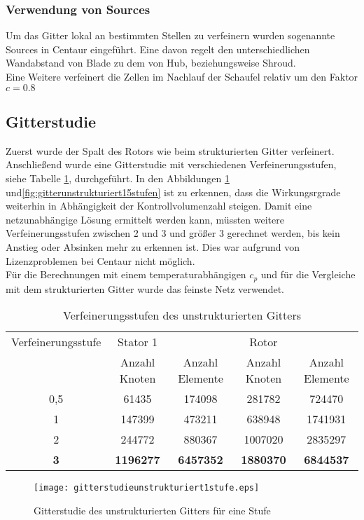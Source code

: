 \subsubsection{Verwendung von Sources}
Um das Gitter lokal an bestimmten Stellen zu verfeinern wurden sogenannte Sources in Centaur eingeführt.
Eine davon regelt den unterschiedlichen Wandabstand von Blade zu dem von Hub, beziehungsweise Shroud.\\
Eine Weitere verfeinert die Zellen im Nachlauf der Schaufel relativ um den Faktor $c = 0.8$

\subsection{Gitterstudie}
Zuerst wurde der Spalt des Rotors wie beim strukturierten Gitter verfeinert. Anschließend wurde eine Gitterstudie mit verschiedenen Verfeinerungsstufen, siehe Tabelle \ref{tab:verfeinerungenunstrukturiert}, durchgeführt. In den Abbildungen \ref{fig:gitterunstrukturiert1stufe} und\ref{fig:gitterunstrukturiert15stufen} ist zu erkennen, dass die Wirkungsrgrade weiterhin in Abhängigkeit der Kontrollvolumenzahl steigen. Damit eine netzunabhängige Lösung ermittelt werden kann, müssten weitere Verfeinerungsstufen zwischen 2 und 3 und größer 3 gerechnet werden, bis kein Anstieg oder Absinken mehr zu erkennen ist. Dies war aufgrund von Lizenzproblemen bei Centaur nicht möglich.\\
Für die Berechnungen mit einem temperaturabhängigen $c_p$ und für die Vergleiche mit dem strukturierten Gitter wurde das feinste Netz verwendet.
\begin{table}[h]
		\centering
		\caption{Verfeinerungsstufen des unstrukturierten Gitters}
	\begin{tabular}{ c| c | c| c| c}
Verfeinerungsstufe	&	Stator 1	&		&	Rotor	&		\\
&	Anzahl Knoten	&	Anzahl Elemente	&	Anzahl Knoten	&	Anzahl Elemente	\\
\hline									
0,5	&	61435	&	174098	&	281782	&	724470	\\
1	&	147399	&	473211	&	638948	&	1741931	\\
2	&	244772	&	880367	&	1007020	&	2835297	\\
\textbf{3}	&	\textbf{1196277}	&	\textbf{6457352}	&	\textbf{1880370}	&	\textbf{6844537}	\\

	\end{tabular}
		\label{tab:verfeinerungenunstrukturiert}
\end{table}
\begin{figure}[htbp]
	\centering
	\texttt{[image: gitterstudieunstrukturiert1stufe.eps]}
	\caption{Gitterstudie des unstrukturierten Gitters für eine Stufe} \label{fig:gitterunstrukturiert1stufe}
\end{figure}

